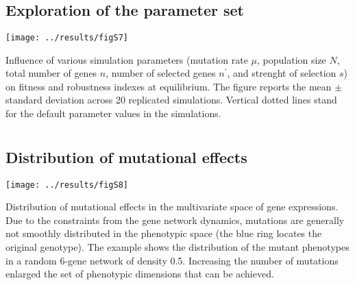 \documentclass[10pt,a4paper]{article}
\begin{document}
\begin{appendices}
  \clearpage
  \section{}
    \label{supp:explo}
    \subsection*{Exploration of the parameter set}
	\begin{center}
	\texttt{[image: ../results/figS7]} 
	\end{center}
	
	{\color{Gray}Influence of various simulation parameters (mutation rate $\mu$, population size $N$, total number of genes $n$, number of selected genes $n^\prime$, and strenght of selection $s$) on fitness and robustness indexes at equilibrium. The figure reports the mean $\pm$ standard deviation across 20 replicated simulations. Vertical dotted lines stand for the default parameter values in the simulations. }

  \clearpage
  \section{}
    \label{supp:mutdist}
    \subsection*{Distribution of mutational effects}
	\begin{center}
	\texttt{[image: ../results/figS8]} 
	\end{center}
	
	{\color{Gray}Distribution of mutational effects in the multivariate space of gene expressions. Due to the constraints from the gene network dynamics, mutations are generally not smoothly distributed in the phenotypic space (the blue ring locates the original genotype). The example shows the distribution of the mutant phenotypes in a random 6-gene network of density 0.5. Increasing the number of mutations enlarged the set of phenotypic dimensions that can be achieved.}




\end{appendices}
\end{document}
